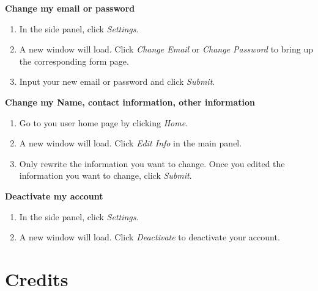 \documentclass[12pt]{report}
\begin{document}
\textbf{Change my email or password}
\begin{enumerate}
\item In the side panel, click \textit{Settings}.
\item A new window will load. Click \textit{Change Email} or \textit{Change Password} to bring up the corresponding form page.
\item Input your new email or password and click \textit{Submit}.
\end{enumerate}
\textbf{Change my Name, contact information, other information}
\begin{enumerate}
\item Go to you user home page by clicking \textit{Home}.
\item A new window will load. Click \textit{Edit Info} in the main panel.
\item Only rewrite the information you want to change. Once you edited the information you want to change, click \textit{Submit}.
\end{enumerate}
\textbf{Deactivate my account}
\begin{enumerate}
\item In the side panel, click \textit{Settings}.
\item A new window will load. Click \textit{Deactivate} to deactivate your account.
\end{enumerate}



\part{Credits}


\appendix
\end{document}
